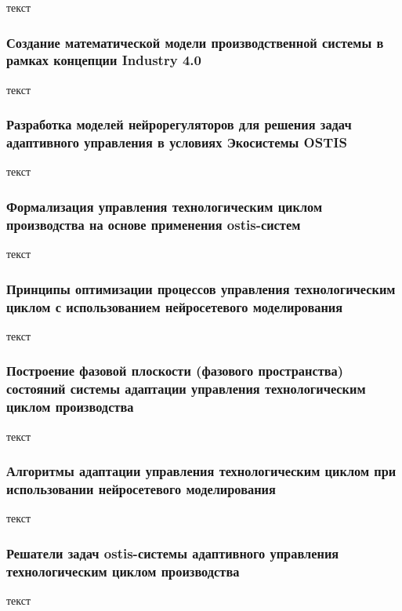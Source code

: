 текст

\subsubsection{Создание математической модели производственной системы в рамках концепции Industry 4.0}

текст

\subsubsection{Разработка моделей нейрорегуляторов для решения задач адаптивного управления в условиях Экосистемы OSTIS}

текст

\subsubsection{Формализация управления технологическим циклом производства на основе применения ostis-систем}

текст

\subsubsection{Принципы оптимизации процессов управления технологическим циклом с использованием нейросетевого моделирования}

текст

\subsubsection{Построение фазовой плоскости (фазового пространства) состояний системы адаптации управления технологическим циклом производства}

текст

\subsubsection{Алгоритмы адаптации управления технологическим циклом при использовании нейросетевого моделирования}

текст

\subsubsection{Решатели задач ostis-системы адаптивного управления технологическим циклом производства}

текст

